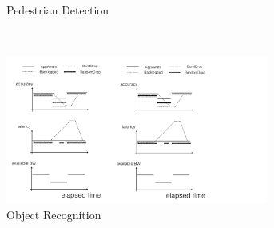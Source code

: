 \begin{figure}[t!]
\begin{subfigure}[t]{0.30\textwidth}
    \caption{Pedestrian Detection}
  \end{subfigure}
  ~
  \begin{subfigure}[t]{0.30\textwidth}
    \centering
    \includegraphics[width=0.95\textwidth]{figures/degrade-placeholder-2.pdf}
    \caption{Object Recognition}
  \end{subfigure}
  ~
  \begin{subfigure}[t]{0.30\textwidth}
    \centering

\end{subfigure}
\end{figure}
